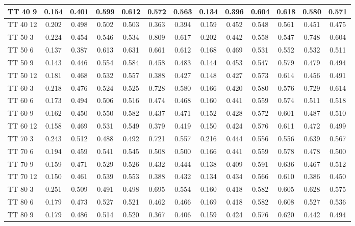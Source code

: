 \documentclass{article}
\begin{document}
\begin{longtable}[c]{|l|c|c|c|c|c|c||c|c|c|c|c|c|}
TT 40  9 & 0.154 & 0.401 & 0.599 & 0.612 & 0.572 & 0.563 & 0.134 & 0.396 & 0.604 & 0.618 & 0.580 & 0.571\\ \hline
TT 40 12 & 0.202 & 0.498 & 0.502 & 0.503 & 0.363 & 0.394 & 0.159 & 0.452 & 0.548 & 0.561 & 0.451 & 0.475\\ \hline
TT 50  3 & 0.224 & 0.454 & 0.546 & 0.534 & 0.809 & 0.617 & 0.202 & 0.442 & 0.558 & 0.547 & 0.748 & 0.604\\ \hline
TT 50  6 & 0.137 & 0.387 & 0.613 & 0.631 & 0.661 & 0.612 & 0.168 & 0.469 & 0.531 & 0.552 & 0.532 & 0.511\\ \hline
TT 50  9 & 0.143 & 0.446 & 0.554 & 0.584 & 0.458 & 0.483 & 0.144 & 0.453 & 0.547 & 0.579 & 0.479 & 0.494\\ \hline
TT 50 12 & 0.181 & 0.468 & 0.532 & 0.557 & 0.388 & 0.427 & 0.148 & 0.427 & 0.573 & 0.614 & 0.456 & 0.491\\ \hline
TT 60  3 & 0.218 & 0.476 & 0.524 & 0.525 & 0.728 & 0.580 & 0.166 & 0.420 & 0.580 & 0.576 & 0.729 & 0.614\\ \hline
TT 60  6 & 0.173 & 0.494 & 0.506 & 0.516 & 0.474 & 0.468 & 0.160 & 0.441 & 0.559 & 0.574 & 0.511 & 0.518\\ \hline
TT 60  9 & 0.162 & 0.450 & 0.550 & 0.582 & 0.437 & 0.471 & 0.152 & 0.428 & 0.572 & 0.601 & 0.487 & 0.510\\ \hline
TT 60 12 & 0.158 & 0.469 & 0.531 & 0.549 & 0.379 & 0.419 & 0.150 & 0.424 & 0.576 & 0.611 & 0.472 & 0.499\\ \hline
TT 70  3 & 0.243 & 0.512 & 0.488 & 0.492 & 0.721 & 0.557 & 0.216 & 0.444 & 0.556 & 0.556 & 0.639 & 0.567\\ \hline
TT 70  6 & 0.194 & 0.459 & 0.541 & 0.545 & 0.508 & 0.500 & 0.166 & 0.441 & 0.559 & 0.578 & 0.478 & 0.500\\ \hline
TT 70  9 & 0.159 & 0.471 & 0.529 & 0.526 & 0.432 & 0.444 & 0.138 & 0.409 & 0.591 & 0.636 & 0.467 & 0.512\\ \hline
TT 70 12 & 0.150 & 0.461 & 0.539 & 0.553 & 0.388 & 0.432 & 0.134 & 0.434 & 0.566 & 0.610 & 0.386 & 0.450\\ \hline
TT 80  3 & 0.251 & 0.509 & 0.491 & 0.498 & 0.695 & 0.554 & 0.160 & 0.418 & 0.582 & 0.605 & 0.628 & 0.575\\ \hline
TT 80  6 & 0.179 & 0.473 & 0.527 & 0.521 & 0.462 & 0.466 & 0.169 & 0.418 & 0.582 & 0.608 & 0.527 & 0.536\\ \hline
TT 80  9 & 0.179 & 0.486 & 0.514 & 0.520 & 0.367 & 0.406 & 0.159 & 0.424 & 0.576 & 0.620 & 0.442 & 0.494\\ \hline

\end{longtable}
\end{document}
